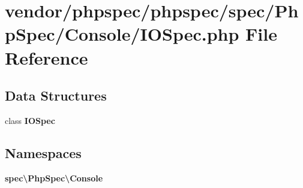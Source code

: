 \section{vendor/phpspec/phpspec/spec/\+Php\+Spec/\+Console/\+I\+O\+Spec.php File Reference}
\label{_console_2_i_o_spec_8php}
\subsection*{Data Structures}
\begin{DoxyCompactItemize}
\item 
class {\bf I\+O\+Spec}
\end{DoxyCompactItemize}
\subsection*{Namespaces}
\begin{DoxyCompactItemize}
\item 
 {\bf spec\textbackslash{}\+Php\+Spec\textbackslash{}\+Console}
\end{DoxyCompactItemize}
